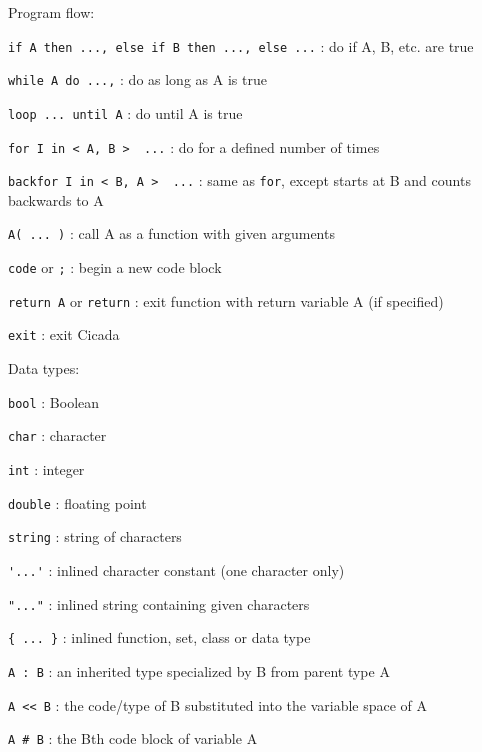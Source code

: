\documentclass{article}
\begin{document}
\noindent
Program flow:
\begin{description}
\item{\verb#if A then ..., else if B then ..., else ...#} :  do if A, B, etc. are true
\item{\verb#while A do ...,#} :  do as long as A is true
\item{\verb#loop ... until A#} :  do until A is true
\item{\verb#for I in < A, B >  ...#} :  do for a defined number of times
\item{\verb#backfor I in < B, A >  ...#} :  same as \verb$for$, except starts at B and counts backwards to A
\item{\verb#A( ... )#} :  call A as a function with given arguments
\item{\verb#code#} or \verb#;# :  begin a new code block
\item{\verb#return A#  or  \verb#return#} :  exit function with return variable A (if specified)
\item{\verb#exit#} :  exit Cicada\\
\end{description}

\noindent
Data types:
\begin{description}
\item{\verb#bool#} :  Boolean
\item{\verb#char#} :  character
\item{\verb#int#} :  integer
\item{\verb#double#} :  floating point
\item{\verb#string#} :  string of characters
\item{\verb#'...'#} :  inlined character constant (one character only)
\item{\verb#"..."#} :  inlined string containing given characters
\item{\verb#{ ... }#} :  inlined function, set, class or data type
\item{\verb#A : B#} :  an inherited type specialized by B from parent type A
\item{\verb#A << B#} :  the code/type of B substituted into the variable space of A
\item{\verb$A # B$} :  the Bth code block of variable A\\
\end{description}

 
\end{document}
